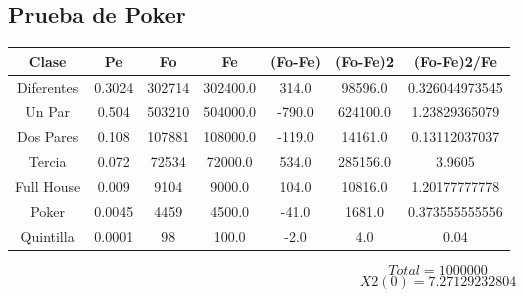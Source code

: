 \documentclass{article}
\begin{document}
\subsection{Prueba de Poker}
\begin{tabular}{|c|c|c|c|c|c|c|}
Clase&Pe&Fo&Fe&(Fo{-}Fe)&(Fo{-}Fe)2&(Fo{-}Fe)2/Fe\\
\hline
Diferentes&0.3024&302714&302400.0&314.0&98596.0&0.326044973545\\
\hline
Un Par&0.504&503210&504000.0&{-}790.0&624100.0&1.23829365079\\
\hline
Dos Pares&0.108&107881&108000.0&{-}119.0&14161.0&0.13112037037\\
\hline
Tercia&0.072&72534&72000.0&534.0&285156.0&3.9605\\
\hline
Full House&0.009&9104&9000.0&104.0&10816.0&1.20177777778\\
\hline
Poker&0.0045&4459&4500.0&{-}41.0&1681.0&0.373555555556\\
\hline
Quintilla&0.0001&98&100.0&{-}2.0&4.0&0.04\\
\end{tabular}
$$
Total = 1000000
$$
$$
X2(0) = 7.27129232804
$$
\end{document}
